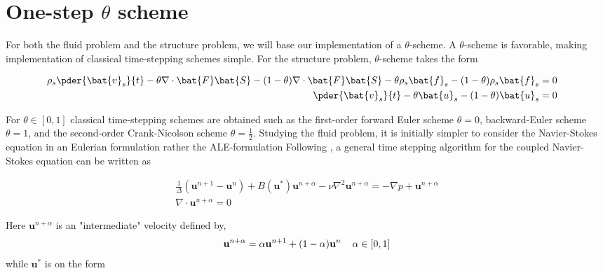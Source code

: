 \section{One-step $\theta$ scheme} 
\label{sec:theta}
For both the fluid problem and the structure problem, we will base our implementation of a $\theta$-scheme.  A $\theta$-scheme is favorable, making implementation of classical time-stepping schemes simple. For the structure problem,  $\theta$-scheme takes the form

\begin{align*}
\rho_s \pder{\bat{v}_s}{t} 
- \theta \nabla \cdot \bat{F}\bat{S}   - (1 - \theta) \nabla \cdot \bat{F}\bat{S}  
- \theta \rho_s \bat{f}_s 
- (1 - \theta) \rho_s \bat{f}_s = 0 \\
\pder{\bat{v}_s}{t} - \theta \bat{u}_s - (1 - \theta)\bat{u}_s  = 0&\\
\end{align*} 


For $\theta \in [0, 1]$ classical time-stepping schemes are obtained such as the first-order forward Euler scheme $\theta = 0$, backward-Euler scheme $\theta = 1$, and the second-order Crank-Nicolson scheme $\theta = \frac{1}{2}$. Studying the fluid problem, it is initially simpler to consider the Navier-Stokes equation in an Eulerian formulation rather the ALE-formulation Following \cite{Simo1994}, a general time stepping algorithm for the coupled Navier-Stokes equation can be written as


\begin{align*}
\frac{1}{\Delta}(\mathbf{u}^{n+1} - \mathbf{u}^{n}) + 
B(\mathbf{u}^{*})\mathbf{u}^{n+\alpha}
- \nu \nabla^2 \mathbf{u}^{n + \alpha} = - \nabla p + \mathbf{u}^{n+\alpha} \\
\nabla \cdot \mathbf{u}^{n+\alpha} = 0 
\end{align*} 


Here $\mathbf{u}^{n+\alpha}$ is an "intermediate" velocity defined by,
\begin{align*}
\mathbf{u}^{n+\alpha} = \alpha\mathbf{u}^{n+1} + (1 - \alpha)\mathbf{u}^{n} 
\hspace{4mm} \alpha \in [0, 1]
\end{align*}
while $\mathbf{u}^{*}$ is on the form

